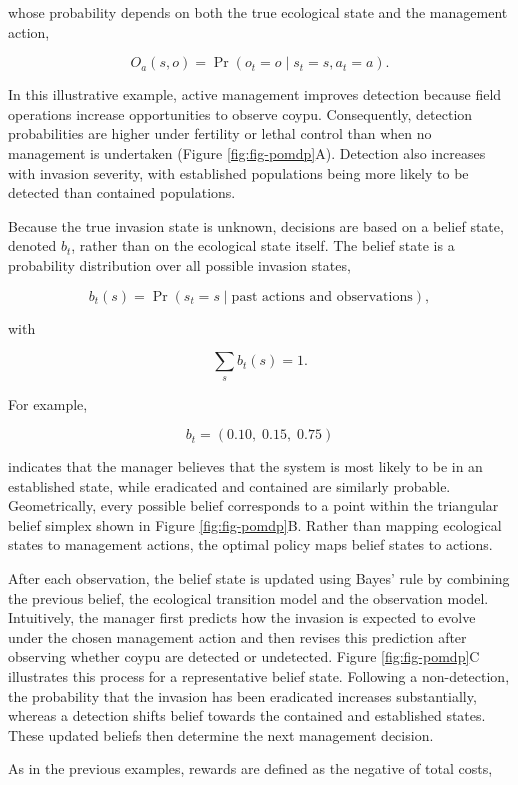 \documentclass[
  11pt,
  a4paper,
]{article}
\begin{document}
whose probability depends on both the true ecological state and the management action,

\[
O_a(s,o)
=
\Pr(o_t=o \mid s_t=s,a_t=a).
\]

In this illustrative example, active management improves detection because field operations increase opportunities to observe coypu. Consequently, detection probabilities are higher under fertility or lethal control than when no management is undertaken (Figure \ref{fig:fig-pomdp}A). Detection also increases with invasion severity, with established populations being more likely to be detected than contained populations.

Because the true invasion state is unknown, decisions are based on a belief state, denoted \(b_t\), rather than on the ecological state itself. The belief state is a probability distribution over all possible invasion states,

\[
b_t(s)
=
\Pr(s_t=s
\mid
\text{past actions and observations}),
\]

with

\[
\sum_s b_t(s)=1.
\]

For example,

\[
b_t=(0.10,\;0.15,\;0.75)
\]

indicates that the manager believes that the system is most likely to be in an established state, while eradicated and contained are similarly probable. Geometrically, every possible belief corresponds to a point within the triangular belief simplex shown in Figure \ref{fig:fig-pomdp}B. Rather than mapping ecological states to management actions, the optimal policy maps belief states to actions.

After each observation, the belief state is updated using Bayes' rule by combining the previous belief, the ecological transition model and the observation model. Intuitively, the manager first predicts how the invasion is expected to evolve under the chosen management action and then revises this prediction after observing whether coypu are detected or undetected. Figure \ref{fig:fig-pomdp}C illustrates this process for a representative belief state. Following a non-detection, the probability that the invasion has been eradicated increases substantially, whereas a detection shifts belief towards the contained and established states. These updated beliefs then determine the next management decision.

As in the previous examples, rewards are defined as the negative of total costs,
\end{document}
